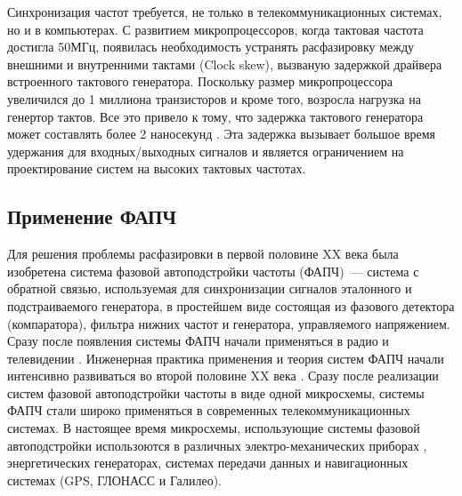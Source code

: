 \documentclass[a4paper,14pt]{article} %
\theoremstyle{cited}
\begin{document}
Синхронизация частот требуется, не только в телекоммуникационных системах, но и в компьютерах. С развитием микропроцессоров, когда тактовая частота достигла 50МГц, появилась необходимость устранять расфазировку между внешними и внутренними тактами (Clock skew), вызваную задержкой драйвера встроенного тактового генератора. Поскольку размер микропроцессора увеличился до 1 миллиона транзисторов и кроме того, возросла нагрузка на генертор тактов. Все это привело к тому, что задержка тактового генератора может составлять более 2 наносекунд \cite{Microprocessors}. Эта задержка вызывает большое время удержания для входных/выходных сигналов и является ограничением на проектирование систем на высоких тактовых частотах.

 \subsection{Применение ФАПЧ}

Для решения проблемы расфазировки в первой половине XX века была изобретена система фазовой автоподстройки частоты \cite{appleton} (ФАПЧ)~--- система с обратной связью, используемая для синхронизации сигналов эталонного и подстраиваемого генератора, в простейшем виде состоящая из фазового детектора (компаратора), фильтра нижних частот и генератора, управляемого напряжением. Сразу после появления системы ФАПЧ начали применяться в радио и телевидении \cite{blagov}. Инженерная практика применения и теория систем ФАПЧ начали интенсивно развиваться во второй половине XX века \cite{seledji}. Сразу после реализации систем фазовой автоподстройки частоты в виде одной микросхемы, системы ФАПЧ стали широко применяться в современных телекоммуникационных системах. В настоящее время микросхемы, использующие системы фазовой автоподстройки использоются в различных электро-механических приборах \cite{best}, энергетических генераторах, системах передачи данных \cite{ashari} и навигационных системах \cite{rao} (GPS, ГЛОНАСС и Галилео).
\end{document}
